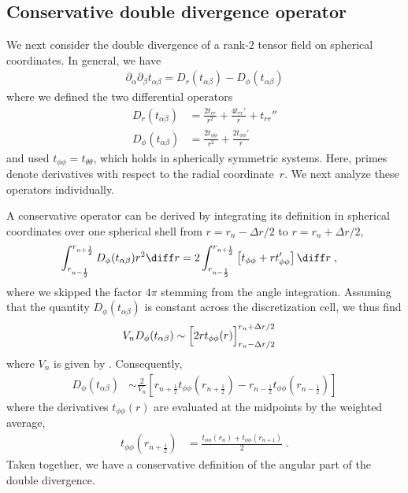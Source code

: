 \documentclass[
	superscriptaddress,
	twocolumn,
	aps, pre
]{revtex4-1}
\newcommand{\dr}{\Delta r}
\begin{document}
\subsection{Conservative double divergence operator}
We next consider the double divergence of a rank-$2$ tensor field on spherical coordinates.
In general, we have
\begin{align}
	\partial_\alpha\partial_\beta t_{\alpha\beta} = D_r(t_{\alpha\beta}) - D_\phi(t_{\alpha\beta})
\end{align}
where we defined the two differential operators 
\begin{subequations}
\begin{align}
	D_r(t_{\alpha\beta}) &= 
	 \frac{2 t_{rr}}{r^2} + \frac{4 t_{rr}'}{r} + t_{rr}''
\\
	D_\phi(t_{\alpha\beta}) &= \frac{2 t_{\phi \phi}}{r^2} + \frac{2t_{\phi \phi }'}{r}
\end{align}
\end{subequations}
and used $t_{\phi\phi}=t_{\theta\theta}$, which holds in spherically symmetric systems.
Here, primes denote derivatives with respect to the radial coordinate~$r$.
We next analyze these operators individually.


A conservative operator can be derived by integrating its definition in spherical coordinates over one spherical shell from $r=r_n - \dr/2$ to $r=r_n  + \dr/2$,
\begin{align}
	\int_{r_{n - \frac12}}^{r_{n + \frac12}} D_\phi(t_{\alpha\beta}) r^2  \diff r
	&= 2\int_{r_{n - \frac12}}^{r_{n + \frac12}} \left[
			t_{\phi \phi} + rt_{\phi \phi }'
		\right]\diff r
	\;,
\end{align}
where we skipped the factor $4\pi$ stemming from the angle integration.
Assuming that the quantity $D_\phi(t_{\alpha\beta})$ is constant across the discretization cell, we thus find
\begin{align}
	V_n D_\phi(t_{\alpha\beta}) 
		&\sim \Bigl[2r t_{\phi \phi}(r)\Bigr]_{r_n - \dr/2}^{r_n + \dr/2}
\end{align}
where $V_n$ is given by . 
Consequently,
\begin{align}
	D_\phi(t_{\alpha\beta}) 
		&\sim \frac{2}{V_n}\left[
			r_{n+\frac12} t_{\phi\phi}(r_{n+\frac12}) - r_{n-\frac12}  t_{\phi\phi}(r_{n-\frac12})
		\right]
\end{align}
where the derivatives $t_{\phi\phi}(r)$ are evaluated at the midpoints by the weighted average,
\begin{align}
	t_{\phi\phi}(r_{n+\frac12}) &= \frac{t_{\phi\phi}(r_{n}) + t_{\phi\phi}(r_{n+1})}{2}
	\;.
\end{align}
Taken together, we have a conservative definition of the angular part of the double divergence.
\end{document}
